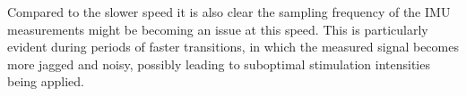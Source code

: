 Compared to the slower speed it is also clear the sampling frequency of the IMU measurements might be becoming an issue at this speed. This is particularly evident during periods of faster transitions, in which the measured signal becomes more jagged and noisy, possibly leading to suboptimal stimulation intensities being applied.



